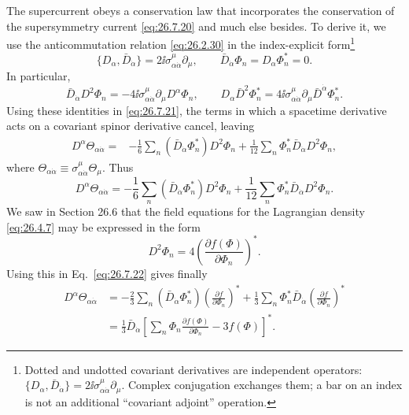 The supercurrent obeys a conservation law that incorporates the conservation
of the supersymmetry current \eqref{eq:26.7.20} and much else besides. To
derive it, we use the anticommutation relation \eqref{eq:26.2.30} in the
index-explicit form\footnote{Dotted and undotted covariant derivatives are
independent operators:
\(\{D_\alpha,\bar D_{\dot\alpha}\}
=2\ii\sigma^\mu_{\alpha\dot\alpha}\partial_\mu\).
Complex conjugation exchanges them; a bar on an index is not an additional
``covariant adjoint'' operation.}
\[
  \{D_\alpha,\bar D_{\dot\alpha}\}
  =2\ii\sigma^\mu_{\alpha\dot\alpha}\partial_\mu,
  \qquad
  \bar D_{\dot\alpha}\Phi_n=D_\alpha\Phi_n^*=0 .
\]
In particular,
\[
  \bar D_{\dot\alpha}D^2\Phi_n
  =-4\ii\sigma^\mu_{\alpha\dot\alpha}
    \partial_\mu D^\alpha\Phi_n,
  \qquad
  D_\alpha\bar D^2\Phi_n^*
  =4\ii\sigma^\mu_{\alpha\dot\alpha}
    \partial_\mu\bar D^{\dot\alpha}\Phi_n^* .
\]
Using these identities in \eqref{eq:26.7.21}, the terms in which a
spacetime derivative acts on a covariant spinor derivative cancel, leaving
\[
  \begin{aligned}
  D^\alpha\Theta_{\alpha\dot\alpha}
  ={}&-\frac{1}{6}\sum_n
    (\bar D_{\dot\alpha}\Phi_n^*)D^2\Phi_n
    +\frac{1}{12}\sum_n
      \Phi_n^*\bar D_{\dot\alpha}D^2\Phi_n ,
  \end{aligned}
\]
where
\(\Theta_{\alpha\dot\alpha}
\equiv\sigma^\mu_{\alpha\dot\alpha}\Theta_\mu\). Thus
\begin{equation}
  D^\alpha\Theta_{\alpha\dot\alpha}
  =-\frac{1}{6}\sum_n
    (\bar D_{\dot\alpha}\Phi_n^*)D^2\Phi_n
   +\frac{1}{12}\sum_n
    \Phi_n^*\bar D_{\dot\alpha}D^2\Phi_n .
  \tag{26.7.22}\label{eq:26.7.22}
\end{equation}
We saw in Section 26.6 that the field equations for the Lagrangian density
\eqref{eq:26.4.7} may be expressed in the form
\begin{equation}
  D^2\Phi_n
  =4\left(\frac{\partial f(\Phi)}{\partial\Phi_n}\right)^* .
  \tag{26.7.23}\label{eq:26.7.23}
\end{equation}
Using this in Eq.~\eqref{eq:26.7.22} gives finally
\begin{equation}
  \begin{aligned}
  D^\alpha\Theta_{\alpha\dot\alpha}
  &=-\frac{2}{3}\sum_n
    (\bar D_{\dot\alpha}\Phi_n^*)
    \left(\frac{\partial f}{\partial\Phi_n}\right)^*
   +\frac{1}{3}\sum_n
    \Phi_n^*\bar D_{\dot\alpha}
    \left(\frac{\partial f}{\partial\Phi_n}\right)^*
  \\
  &=\frac{1}{3}\bar D_{\dot\alpha}
    \left[
      \sum_n\Phi_n\frac{\partial f(\Phi)}{\partial\Phi_n}
      -3f(\Phi)
    \right]^* .
  \end{aligned}
  \tag{26.7.24}\label{eq:26.7.24}
\end{equation}
